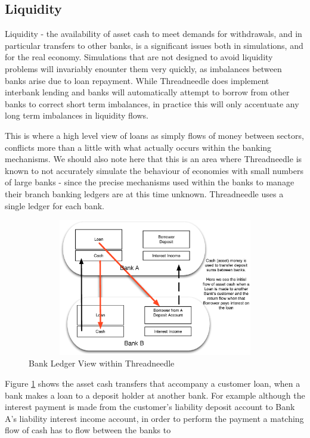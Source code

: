 \documentclass[10pt,oneside,openright, a4paper]{memoir}
\begin{document}
\subsection{Liquidity}
Liquidity - the availability of asset cash to meet demands for
withdrawals, and in particular transfers to other banks, is a 
significant issues both in simulations, and for the real economy.
Simulations that are not designed to avoid liquidity problems
will invariably enounter them very quickly, as imbalances between
banks arise due to loan repayment. While Threadneedle does implement 
interbank lending and banks will automatically attempt
to borrow from other banks to correct short term imbalances, in 
practice this will only accentuate any long term imbalances 
in liquidity flows.
\par
This is where a high level view of loans as simply flows
of money between sectors, conflicts more than a little with 
what actually occurs
within the banking mechanisms. We should also note here that
this is an area where Threadneedle is known to not accurately
simulate the behaviour of economies with small numbers of
large banks - since the precise mechanisms used within the banks
to manage their branch
banking ledgers are at this time unknown. Threadneedle uses
a single ledger for each bank.
\par
\begin{figure}[ht]
\centering
\includegraphics[width=120mm, height=60mm]{images/fig_Money-Flows.eps}
\caption{Bank Ledger View within Threadneedle}
\label{fig:money-flows}
\end{figure}
Figure \ref{fig:money-flows}
shows the asset cash transfers that accompany a customer
loan, when a bank makes a loan to a deposit holder at
another bank. For example although the interest payment is made from 
the customer's liability deposit account to Bank A's liability
interest income account, in order to perform the payment
a matching flow of cash has to flow between the banks to
\end{document}
